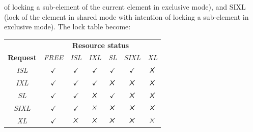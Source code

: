 \documentclass[12pt, a4paper]{report}
\begin{document}
\begin{itemize}
        of locking a sub-element of the current element in exclusive mode), and SIXL (lock of the element in shared mode with intention of locking a sub-element in exclusive mode). 
        The lock table become: 
        \begin{table}[H]
            \centering
            \begin{tabular}{ccccccc}
            \textbf{}                             & \multicolumn{6}{c}{\textbf{Resource status}}                                                                                                                                                                            \\ \cline{2-7} 
            \multicolumn{1}{c|}{\textbf{Request}} & \multicolumn{1}{c|}{\textit{FREE}} & \multicolumn{1}{c|}{\textit{ISL}} & \multicolumn{1}{c|}{\textit{IXL}} & \multicolumn{1}{c|}{\textit{SL}}  & \multicolumn{1}{c|}{\textit{SIXL}} & \multicolumn{1}{c|}{\textit{XL}}  \\ \hline
            \multicolumn{1}{|c|}{\textit{ISL}}    & \multicolumn{1}{c|}{$\checkmark$}  & \multicolumn{1}{c|}{$\checkmark$} & \multicolumn{1}{c|}{$\checkmark$} & \multicolumn{1}{c|}{$\checkmark$} & \multicolumn{1}{c|}{$\checkmark$}  & \multicolumn{1}{c|}{$\tikzxmark$} \\ \hline
            \multicolumn{1}{|c|}{\textit{IXL}}    & \multicolumn{1}{c|}{$\checkmark$}  & \multicolumn{1}{c|}{$\checkmark$} & \multicolumn{1}{c|}{$\checkmark$} & \multicolumn{1}{c|}{$\tikzxmark$} & \multicolumn{1}{c|}{$\tikzxmark$}  & \multicolumn{1}{c|}{$\tikzxmark$} \\ \hline
            \multicolumn{1}{|c|}{\textit{SL}}     & \multicolumn{1}{c|}{$\checkmark$}  & \multicolumn{1}{c|}{$\checkmark$} & \multicolumn{1}{c|}{$\tikzxmark$} & \multicolumn{1}{c|}{$\checkmark$} & \multicolumn{1}{c|}{$\tikzxmark$}  & \multicolumn{1}{c|}{$\tikzxmark$} \\ \hline
            \multicolumn{1}{|c|}{\textit{SIXL}}   & \multicolumn{1}{c|}{$\checkmark$}  & \multicolumn{1}{c|}{$\checkmark$} & \multicolumn{1}{c|}{$\tikzxmark$} & \multicolumn{1}{c|}{$\tikzxmark$} & \multicolumn{1}{c|}{$\tikzxmark$}  & \multicolumn{1}{c|}{$\tikzxmark$} \\ \hline
            \multicolumn{1}{|c|}{\textit{XL}}     & \multicolumn{1}{c|}{$\checkmark$}  & \multicolumn{1}{c|}{$\tikzxmark$} & \multicolumn{1}{c|}{$\tikzxmark$} & \multicolumn{1}{c|}{$\tikzxmark$} & \multicolumn{1}{c|}{$\tikzxmark$}  & \multicolumn{1}{c|}{$\tikzxmark$} \\ \hline

\end{tabular}
\end{table}
\end{itemize}
\end{document}
